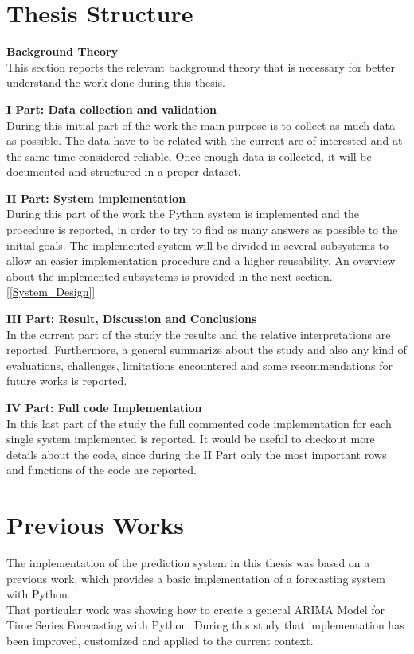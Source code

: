 \newpage

\section{Thesis Structure}
\label{Thesis_Strucutre}
\textbf{Background Theory}\\
This section reports the relevant background theory that is necessary for better understand the work done during this thesis.

\textbf{I Part: Data collection and validation}\\
During this initial part of the work the main purpose is to collect as much data as possible. The data have to be related with the current are of interested and at the same time considered reliable. Once enough data is collected, it will be documented and structured in a proper dataset.


\textbf{II Part: System implementation}\\
During this part of the work the Python system is implemented and the procedure is reported, in order to try to find as many answers as possible to the initial goals. The implemented system will be divided in several subsystems to allow an easier implementation procedure and a higher reusability. An overview about the implemented subsystems is provided in the next section. [\ref{System_Design}]


\textbf{III Part: Result, Discussion and Conclusions }\\
In the current part of the study the results and the relative interpretations are reported. Furthermore, a general summarize about the study and also any kind of evaluations, challenges, limitations encountered and some recommendations for future works is reported.


\textbf{IV Part: Full code Implementation }	\\
In this last part of the study the full commented code implementation for each single system implemented is reported. It would be useful to checkout more details about the code, since during the II Part only the most important rows and functions of the code are reported.


\section{Previous Works}
\vspace{-5mm}
The implementation of the prediction system in this thesis was based on a previous work, which provides a basic implementation of a forecasting system with Python.\\
That particular work was showing how to create a general ARIMA Model for Time Series Forecasting with Python. During this study that implementation has been improved, customized and applied to the current context.

